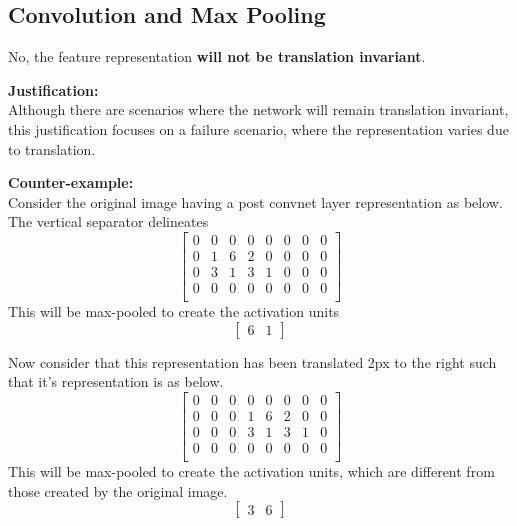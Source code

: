 \documentclass[parskip=half]{scrartcl}
\begin{document}


    \subsection{Convolution and Max Pooling} %
    \label{sub:convolution_and_max_pooling}

        No, the feature representation \textbf{will not be translation invariant}.

        \textbf{Justification:}\\
        Although there are scenarios where the network will remain translation invariant, this justification focuses on a failure scenario, where the representation varies due to translation.

        \textbf{Counter-example:}\\
        Consider the original image having a post convnet layer representation as below. The vertical separator delineates  
        \[
            \left[
                \begin{array}{cccc|cccc}
                    0 & 0 & 0 & 0 & 0 & 0 & 0 & 0 \\
                    0 & 1 & 6 & 2 & 0 & 0 & 0 & 0 \\
                    0 & 3 & 1 & 3 & 1 & 0 & 0 & 0 \\
                    0 & 0 & 0 & 0 & 0 & 0 & 0 & 0 \\
                \end{array}
            \right]
        \]
        This will be max-pooled to create the activation units
        \[
            \left[
                \begin{array}{cc}
                    6 & 1
                \end{array}
            \right]
        \]

        Now consider that this representation has been translated 2px to the right such that it's representation is as below.
        \[
            \left[
                \begin{array}{cccc|cccc}
                    0 & 0 & 0 & 0 & 0 & 0 & 0 & 0 \\
                    0 & 0 & 0 & 1 & 6 & 2 & 0 & 0 \\
                    0 & 0 & 0 & 3 & 1 & 3 & 1 & 0 \\
                    0 & 0 & 0 & 0 & 0 & 0 & 0 & 0 \\
                \end{array}
            \right]
        \]
        This will be max-pooled to create the activation units, which are different from those created by the original image.
        \[
            \left[
                \begin{array}{cc}
                    3 & 6
                \end{array}
            \right]
        \]
\end{document}
